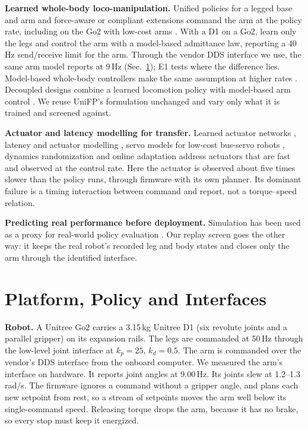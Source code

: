 \documentclass[conference]{IEEEtran}
\begin{document}
\textbf{Learned whole-body loco-manipulation.} Unified policies for a legged base and arm
\citep{fu2022deep, liu2024visual, ha2024umi, liu2026mlm, hu2026tacloco} and force-aware or compliant extensions
\citep{portela2024learning, zhi2025unified, xu2025facet} command the arm at the policy rate, including on the Go2 with
low-cost arms \citep{liu2026mlm, hu2026tacloco}. With a D1 on a Go2, \citet{schperberg2026safe} learn only the legs and
control the arm with a model-based admittance law, reporting a 40\,Hz send/receive limit for the arm. Through the
vendor DDS interface we use, the same arm model reports at 9\,Hz (Sec.~\ref{sec:platform}); E1 tests where the
difference lies. Model-based whole-body
controllers make the same assumption at higher rates \citep{bellicoso2019alma, sleiman2021unified}. Decoupled designs combine a
learned locomotion policy with model-based arm control \citep{ma2022combining}. We reuse UniFP's formulation
\citep{zhi2025unified} unchanged and vary only what it is trained and screened against.

\textbf{Actuator and latency modelling for transfer.} Learned actuator networks \citep{hwangbo2019learning}, latency and
actuator modelling \citep{tan2018sim}, servo models for low-cost bus-servo robots \citep{yu2019sim, haarnoja2024learning}, dynamics randomization \citep{peng2018sim, rudin2022learning} and online adaptation
\citep{kumar2021rma} address actuators that are fast and observed at the control rate. Here the actuator is observed
about five times slower than the policy runs, through firmware with its own planner. Its dominant failure is a timing
interaction between command and report, not a torque--speed relation.

\textbf{Predicting real performance before deployment.} Simulation has been used as a proxy for real-world policy
evaluation \citep{li2024evaluating}. Our replay screen goes the other way: it keeps the real robot's recorded leg and body
states and closes only the arm through the identified interface.

\section{Platform, Policy and Interfaces}
\label{sec:platform}

\textbf{Robot.} A Unitree Go2 carries a 3.15\,kg Unitree D1 (six revolute joints and a parallel gripper) on its expansion
rails. The legs are commanded at 50\,Hz through the low-level joint interface at $k_p{=}25$, $k_d{=}0.5$. The arm is
commanded over the vendor's DDS interface from the onboard computer. We measured the arm's interface on hardware. It reports joint angles at
9.00\,Hz. Its joints slew at 1.2--1.3\,rad/s. The firmware ignores a command without a gripper angle, and plans each new
setpoint from rest, so a stream of setpoints moves the arm well below its single-command speed. Releasing torque drops the
arm, because it has no brake, so every stop must keep it energized.
\end{document}
